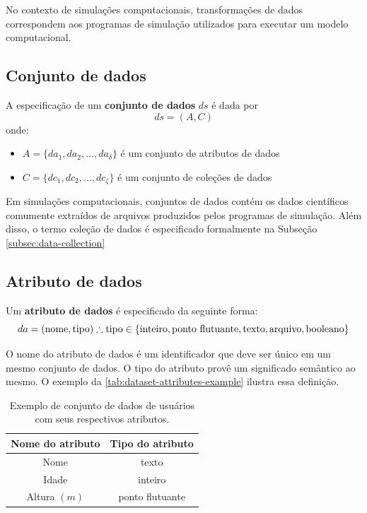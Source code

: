 No contexto de simulações computacionais, transformações de dados correspondem aos programas de simulação utilizados para executar um modelo computacional. 

\subsection{Conjunto de dados}

A especificação de um \textbf{conjunto de dados} \( ds \) é dada por \[ ds = (A, C) \] onde:
\begin{itemize}
    \item \( A = \{da_1, da_2, \ldots, da_{\delta} \} \) é um conjunto de atributos de dados
    \item \( C = \{dc_1, dc_2, \ldots, dc_{\zeta} \} \) é um conjunto de coleções de dados
\end{itemize}

Em simulações computacionais, conjuntos de dados contém os dados científicos comumente extraídos de arquivos produzidos pelos programas de simulação. Além disso, o termo coleção de dados é especificado formalmente na Subseção \ref{subsec:data-collection}

\subsection{Atributo de dados}

Um \textbf{atributo de dados} é especificado da seguinte forma: \[ da = (\textrm{nome},\textrm{tipo}) \therefore \textrm{tipo} \in \{\textup{inteiro}, \textup{ponto flutuante}, \textup{texto}, \textup{arquivo}, \textup{booleano}\} \]

O nome do atributo de dados é um identificador que deve ser único em um mesmo conjunto de dados. O tipo do atributo provê um significado semântico ao mesmo. O exemplo da \autoref{tab:dataset-attributes-example} ilustra essa definição.

\begin{table}[htb]
    \centering
    \begin{tabular}{|c|c|}
        \hline
        \textbf{Nome do atributo} & \textbf{Tipo do atributo} \\
        \hline
        Nome             & texto           \\
        \hline
        Idade            & inteiro         \\
        \hline
        Altura \( (m) \) & ponto flutuante \\
        \hline
    \end{tabular}
    \caption[Exemplo de conjunto de dados com seus atributos de dados]{Exemplo de conjunto de dados de usuários com seus respectivos atributos.}%
    \label{tab:dataset-attributes-example}
\end{table}

